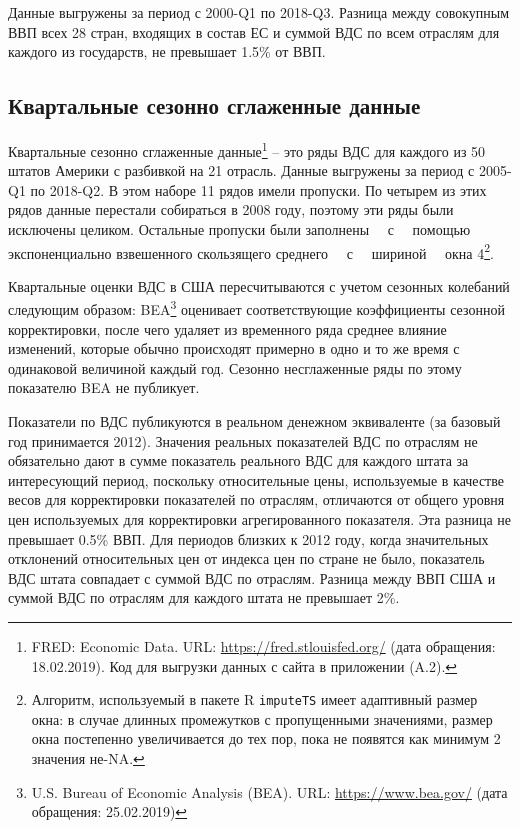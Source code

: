 \documentclass[12pt,a4paper, oneside]{extreport}
\begin{document}
Данные выгружены за период с 2000-Q1 по 2018-Q3. 
Разница между совокупным ВВП всех 28 стран, входящих в состав ЕС  и суммой ВДС по всем отраслям для каждого из государств, не превышает  1.5\% от ВВП. 

\subsection{Квартальные сезонно сглаженные данные}

Квартальные сезонно сглаженные данные\footnote{FRED: Economic Data. URL: \url{https://fred.stlouisfed.org/} (дата обращения: 18.02.2019). Код для выгрузки данных с сайта в приложении (A.2).} -- это ряды ВДС  для каждого из 50 штатов Америки с разбивкой на 21 отрасль.  Данные выгружены за период с 2005-Q1 по 2018-Q2. 
В этом наборе 11 рядов имели пропуски. По четырем из этих рядов  данные перестали собираться в 2008 году, поэтому эти ряды были исключены целиком. Остальные пропуски  были заполнены \ \ с \ \ помощью экспоненциально взвешенного скользящего среднего \ \  с \ \  шириной \  \  окна 4\footnote{Алгоритм, используемый в пакете R \texttt{imputeTS}   имеет адаптивный размер окна: в случае длинных промежутков с пропущенными значениями, размер окна постепенно увеличивается до тех пор, пока не появятся как минимум 2 значения не-NA. }. 

Квартальные оценки ВДС в США пересчитываются с учетом сезонных колебаний следующим образом: BEA\footnote{U.S. Bureau of Economic Analysis (BEA). URL: \url{https://www.bea.gov/}  (дата обращения: 25.02.2019) } оценивает соответствующие коэффициенты сезонной корректировки, после чего удаляет из временного ряда среднее влияние изменений, которые обычно происходят примерно в одно и то же время  с одинаковой величиной каждый год. Сезонно несглаженные ряды по этому показателю BEA не публикует.

Показатели по ВДС публикуются в реальном денежном эквиваленте (за базовый год принимается 2012).
Значения реальных показателей ВДС по отраслям не обязательно дают в сумме показатель реального ВДС для каждого штата за интересующий период, поскольку относительные цены, используемые в качестве весов для корректировки показателей по отраслям, отличаются от общего уровня цен используемых для корректировки агрегированного показателя. Эта разница не превышает 0.5\% ВВП.
Для периодов близких к 2012 году, когда значительных отклонений относительных цен от индекса цен по стране не было, показатель ВДС штата совпадает с суммой ВДС по отраслям. 
Разница между ВВП США и суммой ВДС по отраслям для каждого штата не превышает 2\%. 
\end{document}
